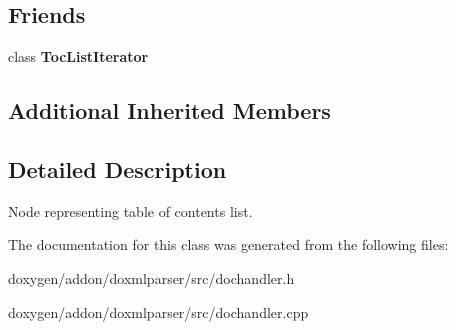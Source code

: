 \subsection*{Friends}
\begin{DoxyCompactItemize}
\item 
\mbox{\label{class_toc_list_handler_a408a0a39bf0ac772f670068b0d8c2892}} 
class {\bfseries Toc\+List\+Iterator}
\end{DoxyCompactItemize}
\subsection*{Additional Inherited Members}


\subsection{Detailed Description}
Node representing table of contents list. 



The documentation for this class was generated from the following files\+:\begin{DoxyCompactItemize}
\item 
doxygen/addon/doxmlparser/src/dochandler.\+h\item 
doxygen/addon/doxmlparser/src/dochandler.\+cpp\end{DoxyCompactItemize}
